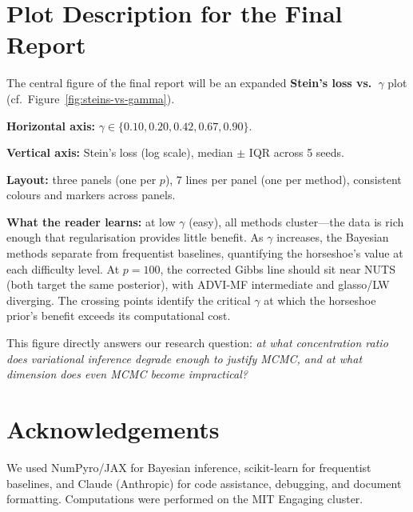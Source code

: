 \documentclass[10pt,conference,compsoc]{IEEEtran}
\begin{document}
\section{Plot Description for the Final Report}

The central figure of the final report will be an expanded \textbf{Stein's loss vs.\ $\gamma$} plot (cf.\ Figure~\ref{fig:steins-vs-gamma}).

\textbf{Horizontal axis:} $\gamma\in \{0.10, 0.20, 0.42, 0.67, 0.90\}$.

\textbf{Vertical axis:} Stein's loss (log scale), median $\pm$ IQR across 5 seeds.

\textbf{Layout:} three panels (one per $p$), 7 lines per panel (one per method), consistent colours and markers across panels.

\textbf{What the reader learns:} at low $\gamma$ (easy), all methods cluster---the data is rich enough that regularisation provides little benefit. As $\gamma$ increases, the Bayesian methods separate from frequentist baselines, quantifying the horseshoe's value at each difficulty level. At $p{=}100$, the corrected Gibbs line should sit near NUTS (both target the same posterior), with ADVI-MF intermediate and glasso/LW diverging. The crossing points identify the critical $\gamma$ at which the horseshoe prior's benefit exceeds its computational cost.

This figure directly answers our research question: \emph{at what concentration ratio does variational inference degrade enough to justify MCMC, and at what dimension does even MCMC become impractical?}

\section*{Acknowledgements}
We used NumPyro/JAX for Bayesian inference, scikit-learn for frequentist baselines, and Claude (Anthropic) for code assistance, debugging, and document formatting. Computations were performed on the MIT Engaging cluster.
\end{document}
